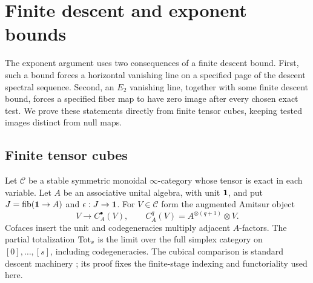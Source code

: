 \section{Finite descent and exponent bounds}\label{sec:towers}
The exponent argument uses two consequences of a finite descent bound.
First, such a bound forces a horizontal vanishing line on a specified
page of the descent spectral sequence. Second, an $E_2$ vanishing line,
together with some finite descent bound, forces a specified fiber map
to have zero image after every chosen exact test. We prove these
statements directly from finite tensor cubes, keeping tested images
distinct from null maps.

\subsection{Finite tensor cubes}\label{par:tower-setup}
Let $\mathcal C$ be a stable symmetric monoidal $\infty$-category whose tensor is
exact in each variable. Let $A$ be an associative unital algebra, with unit
$\mathbf 1$, and put $J=\operatorname{fib}(\mathbf 1\to A)$ and $\epsilon:J\to\mathbf 1$.
For $V\in\mathcal C$ form the augmented Amitsur object
\[
 V\longrightarrow C_A^\bullet(V),\qquad
 C_A^q(V)=A^{\otimes(q+1)}\otimes V.
\]
Cofaces insert the unit and codegeneracies multiply adjacent $A$-factors.
The partial totalization $\operatorname{Tot}_s$ is the limit over the full simplex
category on $[0],\ldots,[s]$, including codegeneracies. The cubical
comparison is standard
descent machinery \cite[Proposition~2.14, pp.~1007--1008]{mnn2017}; its proof fixes the
finite-stage indexing and functoriality used here.

